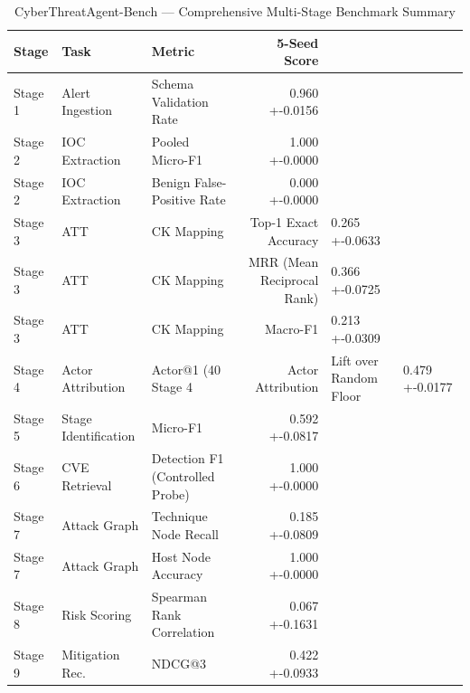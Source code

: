 \begin{table}[t]
\centering
\caption{CyberThreatAgent-Bench --- Comprehensive Multi-Stage Benchmark Summary}
\label{tab:summary}
\begin{tabular}{lllr}
\toprule
Stage & Task & Metric & 5-Seed Score \\ \midrule
Stage 1 & Alert Ingestion & Schema Validation Rate & 0.960 +-0.0156 \\
Stage 2 & IOC Extraction & Pooled Micro-F1 & 1.000 +-0.0000 \\
Stage 2 & IOC Extraction & Benign False-Positive Rate & 0.000 +-0.0000 \\
Stage 3 & ATT&CK Mapping & Top-1 Exact Accuracy & 0.265 +-0.0633 \\
Stage 3 & ATT&CK Mapping & MRR (Mean Reciprocal Rank) & 0.366 +-0.0725 \\
Stage 3 & ATT&CK Mapping & Macro-F1 & 0.213 +-0.0309 \\
Stage 4 & Actor Attribution & Actor@1 (40%
Stage 4 & Actor Attribution & Lift over Random Floor & 0.479 +-0.0177 \\
Stage 5 & Stage Identification & Micro-F1 & 0.592 +-0.0817 \\
Stage 6 & CVE Retrieval & Detection F1 (Controlled Probe) & 1.000 +-0.0000 \\
Stage 7 & Attack Graph & Technique Node Recall & 0.185 +-0.0809 \\
Stage 7 & Attack Graph & Host Node Accuracy & 1.000 +-0.0000 \\
Stage 8 & Risk Scoring & Spearman Rank Correlation & 0.067 +-0.1631 \\
Stage 9 & Mitigation Rec. & NDCG@3 & 0.422 +-0.0933 \\
\bottomrule
\end{tabular}
\end{table}